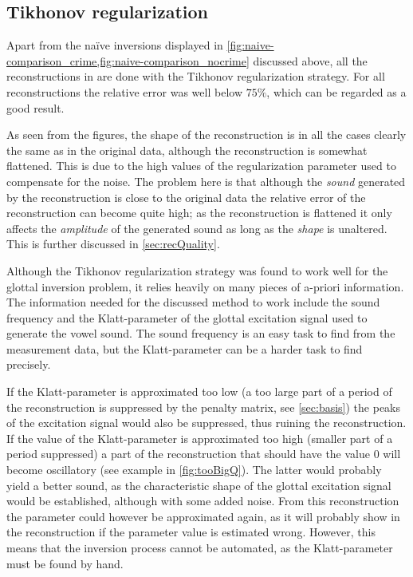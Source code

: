 \documentclass[12pt,a4]{article}
\begin{document}
\subsection{Tikhonov regularization}
\label{sec:tikDiscussion}

Apart from the naïve inversions displayed in \cref{fig:naive-comparison_crime,fig:naive-comparison_nocrime} discussed above, all the reconstructions in  are done with the Tikhonov regularization strategy. For all reconstructions the relative error was well below $75 \%$, which can be regarded as a good result.

As seen from the figures, the shape of the reconstruction is in all the cases clearly the same as in the original data, although the reconstruction is somewhat flattened. This is due to the high values of the regularization parameter used to compensate for the noise. The problem here is that although the \emph{sound} generated by the reconstruction is close to the original data the relative error of the reconstruction can become quite high; as the reconstruction is flattened it only affects the \emph{amplitude} of the generated sound as long as the \emph{shape} is unaltered. This is further discussed in \cref{sec:recQuality}.

Although the Tikhonov regularization strategy was found to work well for the glottal inversion problem, it relies heavily on many pieces of a-priori information. The information needed for the discussed method to work include the sound frequency and the Klatt-parameter of the glottal excitation signal used to generate the vowel sound. The sound frequency is an easy task to find from the measurement data, but the Klatt-parameter can be a harder task to find precisely.

If the Klatt-parameter is approximated too low (a too large part of a period of the reconstruction is suppressed by the penalty matrix, see \cref{sec:basis}) the peaks of the excitation signal would also be suppressed, thus ruining the reconstruction. If the value of the Klatt-parameter is approximated too high (smaller part of a period suppressed) a part of the reconstruction that should have the value 0 will become oscillatory (see example in \cref{fig:tooBigQ}). The latter would probably yield a better sound, as the characteristic shape of the glottal excitation signal would be established, although with some added noise. From this reconstruction the parameter could however be approximated again, as it will probably show in the reconstruction if the parameter value is estimated wrong. However, this means that the inversion process cannot be automated, as the Klatt-parameter must be found by hand.
\end{document}
